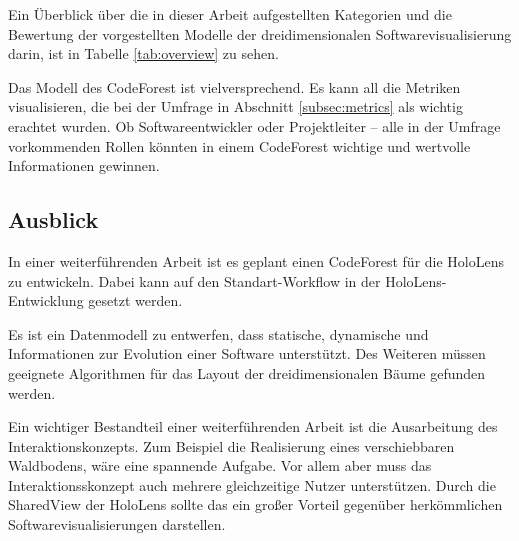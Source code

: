 Ein Überblick über die in dieser Arbeit aufgestellten Kategorien und die Bewertung der vorgestellten Modelle der dreidimensionalen Softwarevisualisierung darin, ist in Tabelle \ref{tab:overview} zu sehen.

Das Modell des CodeForest ist vielversprechend. Es kann all die Metriken visualisieren, die bei der Umfrage in Abschnitt \ref{subsec:metrics} als wichtig erachtet wurden. Ob Softwareentwickler oder Projektleiter -- alle in der Umfrage vorkommenden Rollen könnten in einem CodeForest wichtige und wertvolle Informationen gewinnen.

\subsection{Ausblick}

In einer weiterführenden Arbeit ist es geplant einen CodeForest für die HoloLens zu entwickeln. Dabei kann auf den Standart-Workflow in der HoloLens-Entwicklung gesetzt werden.

Es ist ein Datenmodell zu entwerfen, dass statische, dynamische und Informationen zur Evolution einer Software unterstützt. Des Weiteren müssen geeignete Algorithmen für das Layout der dreidimensionalen Bäume gefunden werden.

Ein wichtiger Bestandteil einer weiterführenden Arbeit ist die Ausarbeitung des Interaktionskonzepts. Zum Beispiel die Realisierung eines verschiebbaren Waldbodens, wäre eine spannende Aufgabe. Vor allem aber muss das Interaktionsskonzept auch mehrere gleichzeitige Nutzer unterstützen. Durch die SharedView der HoloLens sollte das ein großer Vorteil gegenüber herkömmlichen Softwarevisualisierungen darstellen.

 

